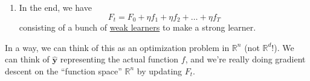\begin{definition}
\begin{enumerate}
\begin{enumerate}
          \item We update  
            \begin{equation}
              F_t = F_{t-1} + \eta \cdot f_t
            \end{equation}
        \end{enumerate}
      \item In the end, we have 
        \begin{equation}
          F_t = F_0 + \eta f_1 + \eta f_2 + \ldots + \eta f_T
        \end{equation}
        consisting of a bunch of \hyperref[def:weak-learner]{weak learners} to make a strong learner. 
    \end{enumerate}
  \end{definition}

  In a way, we can think of this as an optimization problem in $\mathbb{R}^n$ (not $\mathbb{R}^d$!). We can think of $\hat{\mathbf{y}}$ representing the actual function $f$, and we're really doing gradient descent on the ``function space'' $\mathbb{R}^n$ by updating $F_t$. 

